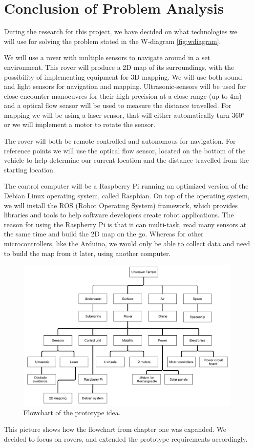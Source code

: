 \section{Conclusion of Problem Analysis}

During the research for this project, we have decided on what technologies we will use for solving the problem stated in the W-diagram \ref{fig:wdiagram}.

We will use a rover with multiple sensors to navigate around in a set environment. This rover will produce a 2D map of its surroundings, with the possibility of implementing equipment for 3D mapping. We will use both sound and light sensors for navigation and mapping. Ultrasonic-sensors will be used for close encounter manoeuvres for their high precision at a close range (up to 4m)\cite{hcsr40datesheet} and a optical flow sensor will be used to measure the distance travelled. For mapping we will be using a laser sensor, that will either automatically turn 360$^{\circ}$ or we will implement a motor to rotate the sensor.

The rover will both be remote controlled and autonomous for navigation. For reference points we will use the optical flow sensor, located on the bottom of the vehicle to help determine our current location and the distance travelled from the starting location.

The control computer will be a Raspberry Pi running an optimized version of the Debian Linux operating system, called Raspbian. On top of the operating system, we will install the ROS (Robot Operating System) framework, which provides libraries and tools to help software developers create robot applications\cite{ros}.
The reason for using the Raspberry Pi is that it can multi-task, read many sensors at the same time and build the 2D map on the go. Whereas for other microcontrollers, like the Arduino, we would only be able to collect data and need to build the map from it later, using another computer.

\begin{figure}[H]
	\centering
	\includegraphics[scale=.1]{images/level3.png}
	\caption{Flowchart of the prototype idea.}
	\label{fig:level3}
\end{figure}

This picture shows how the flowchart from chapter one was expanded. We decided to focus on rovers, and extended the prototype requirements accordingly.

\clearpage
